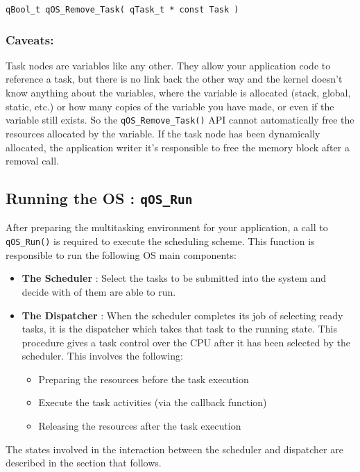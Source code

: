 \begin{lstlisting}[style=CStyle]
qBool_t qOS_Remove_Task( qTask_t * const Task )
\end{lstlisting}

\subsubsection*{Caveats:}
Task nodes are variables like any other. They allow your application code to reference a task, but there is no link back the other way and the kernel doesn't know anything about the variables, where the variable is allocated (stack, global, static, etc.) or how many copies of the variable you have made, or even if the variable still exists.  So the \lstinline{qOS_Remove_Task()} API cannot automatically free the resources allocated by the variable. 
If the task node has been dynamically allocated, the application writer it's responsible to free the memory block after a removal call.


\subsection{Running the OS : \lstinline{qOS_Run}}
After preparing the multitasking environment for your application, a call to \lstinline{qOS_Run()}  is required to execute the scheduling scheme.
This function is responsible to run the following OS main components:
\begin{itemize}
    \item \textbf{The Scheduler} : Select the tasks to be submitted into the system and decide with of them are able to run.
    \item \textbf{The Dispatcher} : When the scheduler completes its job of selecting ready tasks, it is the dispatcher which takes that task to the running state. This procedure gives a task control over the CPU after it has been selected by the scheduler. This involves the following:
    \begin{itemize}
        \item Preparing the resources before the task execution
        \item Execute the task activities (via the callback function)
        \item Releasing the resources after the task execution 
    \end{itemize}
\end{itemize}

The states involved in the interaction between the scheduler and dispatcher are described in the section that follows. \\

